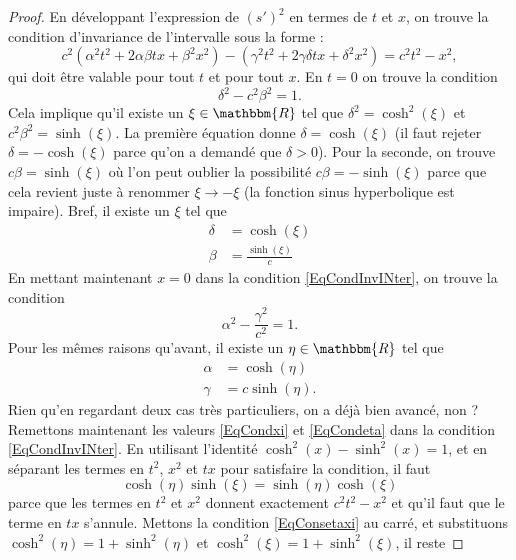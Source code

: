 \documentclass[a4paper,12pt]{book}
\newcommand{\eR}{\mathbbm{R}}
\theoremstyle{mes_exemples}	\newtheorem{exemple}[numtho]{Exemple}
\theoremstyle{mes_tho}
\begin{document}
\begin{proof}
	 En développant l'expression de $(s')^2$ en termes de $t$ et $x$, on trouve la condition d'invariance de l'intervalle sous la forme :
	\begin{equation}	\label{EqCondInvINter}
		c^2(\alpha^2 t^2+2\alpha\beta tx+\beta^2x^2)-(\gamma^2t^2+2\gamma\delta tx+\delta^2x^2)=c^2t^2-x^2,
	\end{equation}
	qui doit être valable pour tout $t$ et pour tout $x$. En $t=0$ on trouve la condition
	\begin{equation}
		\delta^2-c^2\beta^2=1.
	\end{equation}
	Cela implique qu'il existe un $\xi\in\eR$ tel que $\delta^2=\cosh^2(\xi)$ et $c^2\beta^2=\sinh(\xi)$. La première équation donne $\delta=\cosh(\xi)$ (il faut rejeter $\delta=-\cosh(\xi)$ parce qu'on a demandé que $\delta>0$). Pour la seconde, on trouve $c\beta=\sinh(\xi)$ où l'on peut oublier la possibilité $c\beta=-\sinh(\xi)$ parce que cela revient juste à renommer $\xi\to-\xi$ (la fonction sinus hyperbolique est impaire). Bref, il existe un $\xi$ tel que
	\begin{equation}	\label{EqCondxi}
		\begin{split}
			\delta&=\cosh(\xi)\\
			\beta&=\frac{\sinh(\xi)}{c}
		\end{split}
	\end{equation}
	En mettant maintenant $x=0$ dans la condition \eqref{EqCondInvINter}, on trouve la condition
	\[ 
		 \alpha^2-\frac{ \gamma^2 }{ c^2 }=1.
	\]
	Pour les mêmes raisons qu'avant, il existe un $\eta\in\eR$ tel que
	\begin{equation}	\label{EqCondeta}
	\begin{split}
		\alpha&=\cosh(\eta)\\
		\gamma&=c\sinh(\eta).
	\end{split}
	\end{equation}  
	Rien qu'en regardant deux cas très particuliers, on a déjà bien avancé, non ? Remettons maintenant les valeurs \eqref{EqCondxi} et \eqref{EqCondeta} dans la condition \eqref{EqCondInvINter}. En utilisant l'identité $\cosh^2(x)-\sinh^2(x)=1$, et en séparant les termes en $t^2$, $x^2$ et $tx$ pour satisfaire la condition, il faut 
	\begin{equation}	\label{EqConsetaxi}
	  \cosh(\eta)\sinh(\xi)=\sinh(\eta)\cosh(\xi)
	\end{equation}
	parce que les termes en $t^2$ et $x^2$ donnent exactement $c^2t^2-x^2$ et qu'il faut que le terme en $tx$ s'annule. Mettons la condition \eqref{EqConsetaxi} au carré, et substituons $\cosh^2(\eta)=1+\sinh^2(\eta)$ et $\cosh^2(\xi)=1+\sinh^2(\xi)$, il reste

\end{proof}
\end{document}
